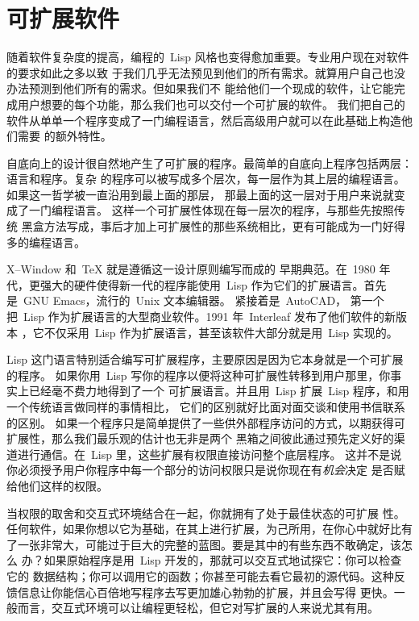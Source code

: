 \section{可扩展软件}
\label{sec:extensible_software}

随着软件复杂度的提高，编程的~Lisp 风格也变得愈加重要。专业用户现在对软件的要求如此之多以致
于我们几乎无法预见到他们的所有需求。就算用户自己也没办法预测到他们所有的需求。但如果我们不
能给他们一个现成的软件，让它能完成用户想要的每个功能，那么我们也可以交付一个可扩展的软件。
我们把自己的软件从单单一个程序变成了一门编程语言，然后高级用户就可以在此基础上构造他们需要
的额外特性。

自底向上的设计很自然地产生了可扩展的程序。最简单的自底向上程序包括两层：语言和程序。复杂
的程序可以被写成多个层次，每一层作为其上层的编程语言。如果这一哲学被一直沿用到最上面的那层，
那最上面的这一层对于用户来说就变成了一门编程语言。
这样一个可扩展性体现在每一层次的程序，与那些先按照传统
黑盒方法写成，事后才加上可扩展性的那些系统相比，更有可能成为一门好得多的编程语言。

X--Window 和~\TeX{} 就是遵循这一设计原则编写而成的
早期典范。在~1980 年代，更强大的硬件使得新一代的程序能使用~Lisp 
作为它们的扩展语言。首先是~GNU Emacs，流行的~Unix 文本编辑器。
紧接着是~AutoCAD，
第一个把~Lisp 作为扩展语言的大型商业软件。1991 年~Interleaf 发布了他们软件的新版本
，它不仅采用~Lisp 作为扩展语言，甚至该软件大部分就是用~Lisp 实现的。

Lisp 这门语言特别适合编写可扩展程序，主要原因是因为它本身就是一个可扩展的程序。
如果你用~Lisp 写你的程序以便将这种可扩展性转移到用户那里，你事实上已经毫不费力地得到了一个
可扩展语言。并且用~Lisp
扩展~Lisp 程序，和用一个传统语言做同样的事情相比，
它们的区别就好比面对面交谈和使用书信联系的区别。
如果一个程序只是简单提供了一些供外部程序访问的方式，以期获得可扩展性，那么我们最乐观的估计也无非是两个
黑箱之间彼此通过预先定义好的渠道进行通信。在~Lisp 里，这些扩展有权限直接访问整个底层程序。
这并不是说你必须授予用户你程序中每一个部分的访问权限\pozhehao{}只是说你现在有\emph{机会}决定
是否赋给他们这样的权限。

当权限的取舍和交互式环境结合在一起，你就拥有了处于最佳状态的可扩展
性。任何软件，如果你想以它为基础，在其上进行扩展，为己所用，在你心中就好比有
了一张非常大，可能过于巨大的完整的蓝图。要是其中的有些东西不敢确定，该怎么
办？如果原始程序是用~Lisp 开发的，那就可以交互式地试探它：你可以检查它的
数据结构；你可以调用它的函数；你甚至可能去看它最初的源代码。这种反
馈信息让你能信心百倍地写程序\pozhehao{}去写更加雄心勃勃的扩展，并且会写得
更快。一般而言，交互式环境可以让编程更轻松，但它对写扩展的人来说尤其有用。

